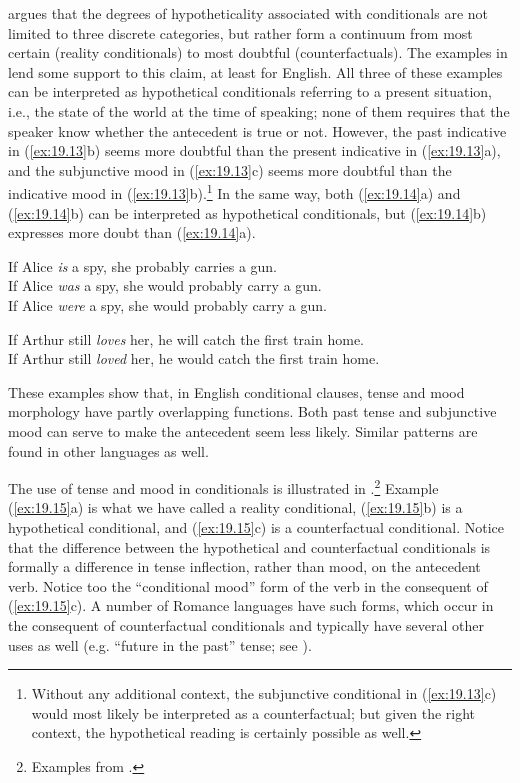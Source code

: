 \citet{Comrie1986} argues that the degrees of hypotheticality associated with conditionals are not limited to three discrete categories, but rather form a continuum from most certain (reality conditionals) to most doubtful (counterfactuals). The examples in  lend some support to this claim, at least for English. All three of these examples can be interpreted as hypothetical conditionals referring to a present situation, i.e., the state of the world at the time of speaking; none of them requires that the speaker know whether the antecedent is true or not. However, the past indicative in (\ref{ex:19.13}b) seems more doubtful than the present indicative in (\ref{ex:19.13}a), and the subjunctive mood in (\ref{ex:19.13}c) seems more doubtful than the indicative mood in (\ref{ex:19.13}b).\footnote{Without any additional context, the subjunctive conditional in (\ref{ex:19.13}c) would most likely be interpreted as a counterfactual; but given the right context, the hypothetical reading is certainly possible as well.} In the same way, both (\ref{ex:19.14}a) and (\ref{ex:19.14}b) can be interpreted as hypothetical conditionals, but (\ref{ex:19.14}b) expresses more doubt than (\ref{ex:19.14}a).


\ea \label{ex:19.13}
\ea  If Alice \textit{is} a spy, she probably carries a gun.\\
\ex If Alice \textit{was} a spy, she would probably carry a gun.\\
\ex If Alice \textit{were} a spy, she would probably carry a gun.
                       \z
\z

\ea \label{ex:19.14}
\ea  If Arthur still \textit{loves} her, he will catch the first train home.\\
\ex If Arthur still \textit{loved} her, he would catch the first train home.
                       \z
\z


These examples show that, in English conditional clauses, tense and mood morphology have partly overlapping functions. Both past tense and subjunctive mood can serve to make the antecedent seem less likely. Similar patterns are found in other languages as well.



The use of tense and mood in  conditionals is illustrated in .\footnote{Examples from \citet{Gomes2008}.} Example (\ref{ex:19.15}a) is what we have called a reality conditional, (\ref{ex:19.15}b) is a hypothetical conditional, and (\ref{ex:19.15}c) is a counterfactual conditional. Notice that the difference between the hypothetical and counterfactual conditionals is formally a difference in tense inflection, rather than mood, on the antecedent verb. Notice too the “conditional mood” form of the verb in the consequent of (\ref{ex:19.15}c). A number of Romance languages have such forms, which occur in the consequent of counterfactual conditionals and typically have several other uses as well (e.g. “future in the past” tense; see ).


